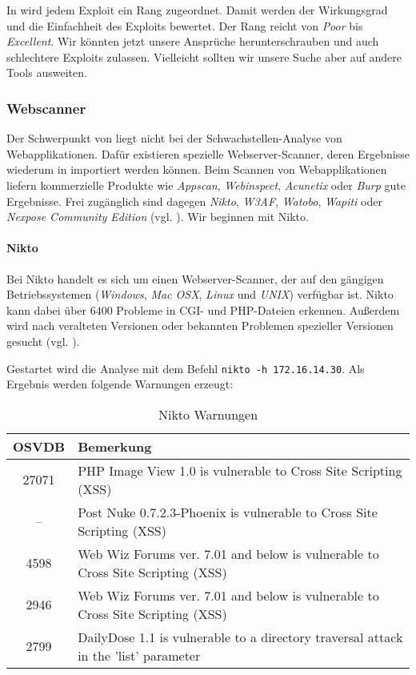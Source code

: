 
In \Metasploit{} wird jedem Exploit ein Rang zugeordnet. Damit werden der
Wirkungsgrad und die Einfachheit des Exploits bewertet. Der Rang reicht von
\emph{Poor} bis \emph{Excellent}. Wir könnten jetzt unsere Ansprüche
herunterschrauben und auch schlechtere Exploits zulassen. Vielleicht sollten wir
unsere Suche aber auf andere Tools ausweiten.


\subsubsection{Webscanner}

Der Schwerpunkt von \Metasploit{} liegt nicht bei der Schwachstellen-Analyse von
Webapplikationen. Dafür existieren spezielle Webserver-Scanner, deren Ergebnisse
wiederum in \Metasploit{} importiert werden können. Beim Scannen von
Webapplikationen liefern kommerzielle Produkte wie \emph{Appscan},
\emph{Webinspect}, \emph{Acunetix} oder \emph{Burp} gute Ergebnisse. Frei
zugänglich sind dagegen \emph{Nikto}, \emph{W3AF}, \emph{Watobo}, \emph{Wapiti}
oder \emph{Nexpose Community Edition} (vgl. \cite[S.~281]{metahandbuch}). Wir
beginnen mit Nikto.

\paragraph{Nikto}

Bei Nikto handelt es sich um einen Webserver-Scanner, der auf den gängigen
Betriebssystemen (\emph{Windows}, \emph{Mac OSX}, \emph{Linux} und \emph{UNIX})
verfügbar ist. Nikto kann dabei über 6400 Probleme in CGI- und PHP-Dateien
erkennen. Außerdem wird nach veralteten Versionen oder bekannten Problemen
spezieller Versionen gesucht (vgl. \cite{Nikto}).

Gestartet wird die Analyse mit dem Befehl \texttt{nikto -h 172.16.14.30}. Als
Ergebnis werden folgende Warnungen erzeugt:

\begin{table}[H]
\caption{Nikto Warnungen}
\label{NiktoResult}
\centering
\begin{tabular}{cp{9cm}}
\toprule
OSVDB\footnotemark & Bemerkung\\
\midrule
27071 & PHP Image View 1.0 is vulnerable to Cross Site Scripting (XSS)\\
-- & Post Nuke 0.7.2.3-Phoenix is vulnerable to Cross Site Scripting (XSS) \\
4598 & Web Wiz Forums ver. 7.01 and below is vulnerable to Cross Site Scripting (XSS)\\
2946 & Web Wiz Forums ver. 7.01 and below is vulnerable to Cross Site Scripting (XSS)\\
2799 & DailyDose 1.1 is vulnerable to a directory traversal attack in the 'list' parameter\\
\bottomrule
\end{tabular}
\end{table}

